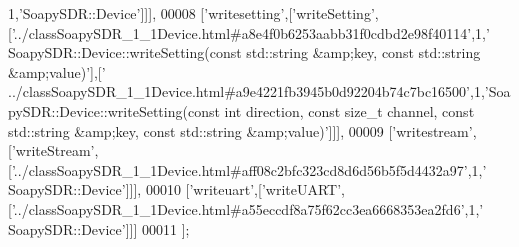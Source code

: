 \begin{DoxyCode}
      1,\textcolor{stringliteral}{'SoapySDR::Device'}]]],
00008   [\textcolor{stringliteral}{'writesetting'},[\textcolor{stringliteral}{'writeSetting'},[\textcolor{stringliteral}{'../classSoapySDR\_1\_1Device.html#a8e4f0b6253aabb31f0cdbd2e98f40114'},1,\textcolor{stringliteral}{'
      SoapySDR::Device::writeSetting(const std::string &amp;key, const std::string &amp;value)'}],[\textcolor{stringliteral}{'
      ../classSoapySDR\_1\_1Device.html#a9e4221fb3945b0d92204b74c7bc16500'},1,\textcolor{stringliteral}{'SoapySDR::Device::writeSetting(const int direction,
       const size\_t channel, const std::string &amp;key, const std::string &amp;value)'}]]],
00009   [\textcolor{stringliteral}{'writestream'},[\textcolor{stringliteral}{'writeStream'},[\textcolor{stringliteral}{'../classSoapySDR\_1\_1Device.html#aff08c2bfc323cd8d6d56b5f5d4432a97'},1,\textcolor{stringliteral}{'
      SoapySDR::Device'}]]],
00010   [\textcolor{stringliteral}{'writeuart'},[\textcolor{stringliteral}{'writeUART'},[\textcolor{stringliteral}{'../classSoapySDR\_1\_1Device.html#a55eccdf8a75f62cc3ea6668353ea2fd6'},1,\textcolor{stringliteral}{'
      SoapySDR::Device'}]]]
00011 ];
\end{DoxyCode}
